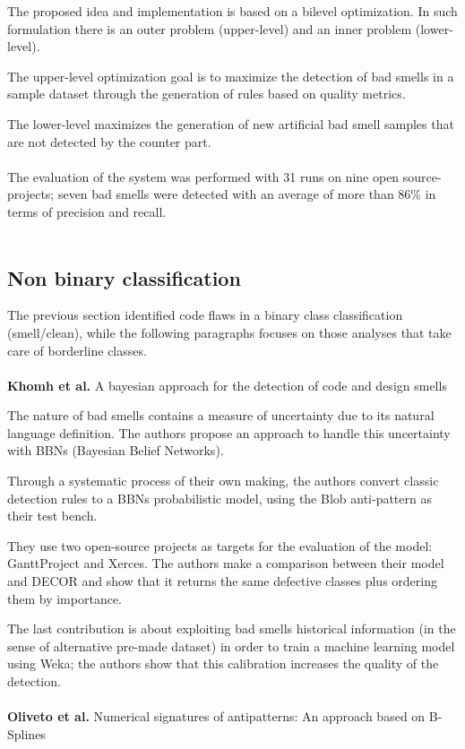 The proposed idea and implementation is based on a bilevel optimization. In such formulation there is an outer problem (upper-level) and an inner problem (lower-level).

The upper-level optimization goal is to maximize the detection of bad smells in a sample dataset through the generation of rules based on quality metrics. 

The lower-level maximizes the generation of new artificial bad smell samples that are not detected by the counter part.
\\
\\
The evaluation of the system was performed with 31 runs on nine open source-projects; seven bad smells were detected with an average of more than 86\% in terms of precision and recall.
\\
\\
\subsection{Non binary classification}
The previous section identified code flaws in a binary class classification (smell/clean), while the following paragraphs focuses on those analyses that take care of borderline classes.
\\
\\
\textbf{Khomh et al.} \cite{khomh2009bayesian} A bayesian approach for the detection of code and design smells
 
The nature of bad smells contains a measure of uncertainty due to its natural language definition. The authors propose an approach to handle this uncertainty with BBNs (Bayesian Belief Networks). 

Through a systematic process of their own making, the authors convert classic detection rules to a BBNs probabilistic model, using the Blob anti-pattern as their test bench.

They use two open-source projects as targets for the evaluation of the model: GanttProject and Xerces. The authors make a comparison between their model and DECOR and show that it returns the same defective classes plus ordering them by importance.

The last contribution is about exploiting bad smells historical information (in the sense of alternative pre-made dataset) in order to train a machine learning model using Weka; the authors show that this calibration increases the quality of the detection.
\\
\\
\textbf{Oliveto et al.} \cite{oliveto2010numerical} Numerical signatures of antipatterns: An approach based on B-Splines

